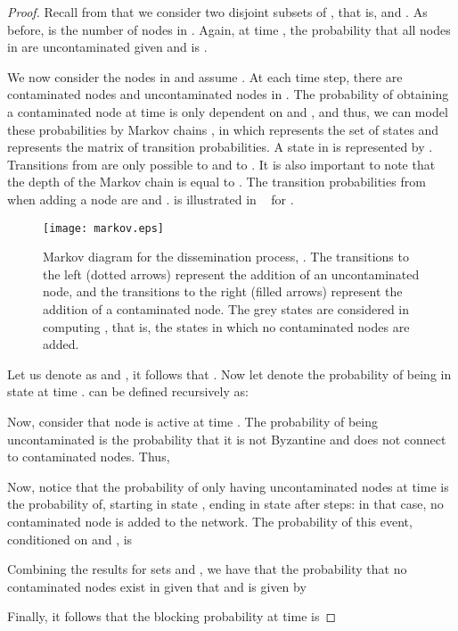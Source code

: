 \begin{proof}
Recall from  that we consider two disjoint subsets of , that is,  and . As before,  is the number of nodes in .
Again, at time , the probability that all nodes in  are uncontaminated given  and  is .




We now consider the nodes in  and assume .
At each time step, there are  contaminated nodes and  uncontaminated nodes in .
The probability of obtaining a contaminated node at time  is only dependent on  and , and thus, we can model these probabilities by Markov chains  , in which  represents the set of states and  represents the matrix of transition probabilities. A state in  is represented by . Transitions from  are only possible to  and to .
It is also important to note that the depth of the Markov chain is equal to . The transition probabilities from  when adding a node  are  and .  is illustrated in ~ for .

\begin{figure}[tbp]
\centering
\texttt{[image: markov.eps]}
\caption{ Markov diagram for the dissemination process, .  The transitions to the left (dotted arrows) represent the addition of an uncontaminated node, and the transitions to the right (filled arrows) represent the addition of a contaminated node. The grey states are considered in computing , that is, the states in which no contaminated nodes are added.}
\label{fig:Markov}
\vspace{-0.5cm}
\end{figure}


Let us denote  as  and , it follows that . Now let   denote the probability of being in state  at time .
 can be defined recursively as:
 \vspace{-0.1cm}
 

Now, consider that node  is active at time . The probability of  being uncontaminated is the probability that it is not Byzantine and does not connect to contaminated nodes. Thus,

\vspace{-0.75cm}

\VONEJSAC{

}

Now, notice that the probability of only having uncontaminated nodes at time  is the probability of, starting in state , ending in state  after  steps: in that case, no contaminated node is added to the network. The probability of this event, conditioned on  and , is

\vspace{-0.7cm}


Combining the results for sets  and , we have that the probability that no contaminated nodes exist in  given that  and  is given by

\vspace{-0.5cm}


Finally, it follows that the blocking probability at time  is

\vspace{-0.5cm}

\end{proof}

